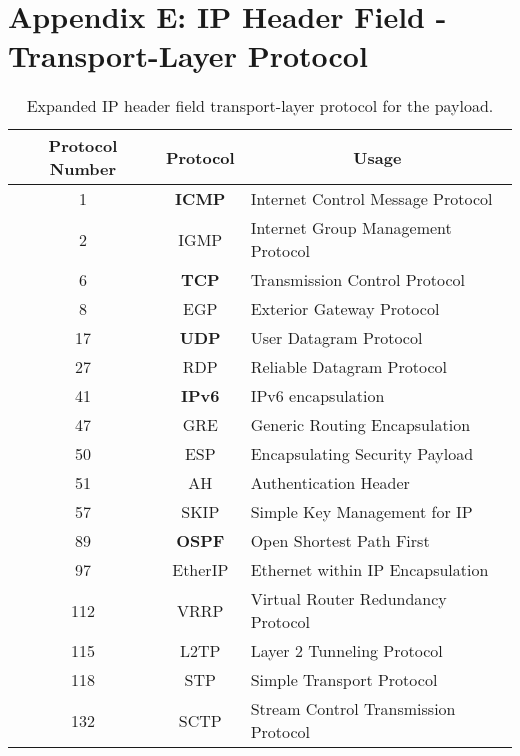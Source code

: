 \renewcommand{\thefigure}{E\arabic{figure}}
\renewcommand{\thetable}{E\arabic{table}}
\setcounter{figure}{0}
\setcounter{table}{0}

\clearpage
\section{Appendix E: IP Header Field - Transport-Layer Protocol}
\label{appendixE}
{
\setlength{\tabcolsep}{16pt}

\begin{table}[h!]
    \centering
    \captionsetup{justification=centering}
    \begin{tabularx}{\textwidth}{ccX}
        \toprule
        \textbf{Protocol Number} & \textbf{Protocol} & \multicolumn{1}{c}{\textbf{Usage}} \\
        \midrule
        1 & \textbf{ICMP} & Internet Control Message Protocol \\
        2 & IGMP & Internet Group Management Protocol \\
        6 & \textbf{TCP} & Transmission Control Protocol \\
        8 & EGP & Exterior Gateway Protocol \\
        17 & \textbf{UDP} & User Datagram Protocol \\
        27 & RDP & Reliable Datagram Protocol \\
        41 & \textbf{IPv6} & IPv6 encapsulation \\
        47 & GRE & Generic Routing Encapsulation \\
        50 & ESP & Encapsulating Security Payload \\
        51 & AH & Authentication Header \\
        57 & SKIP & Simple Key Management for IP \\
        89 & \textbf{OSPF} & Open Shortest Path First \\
        97 & EtherIP & Ethernet within IP Encapsulation \\
        112 & VRRP & Virtual Router Redundancy Protocol \\
        115 & L2TP & Layer 2 Tunneling Protocol \\
        118 & STP & Simple Transport Protocol \\
        132 & SCTP & Stream Control Transmission Protocol \\
        \bottomrule
    \end{tabularx}
    \caption{Expanded IP header field transport-layer protocol for the payload.}
    \label{tab:expanded_ip_protocol_numbers}
\end{table}
}

